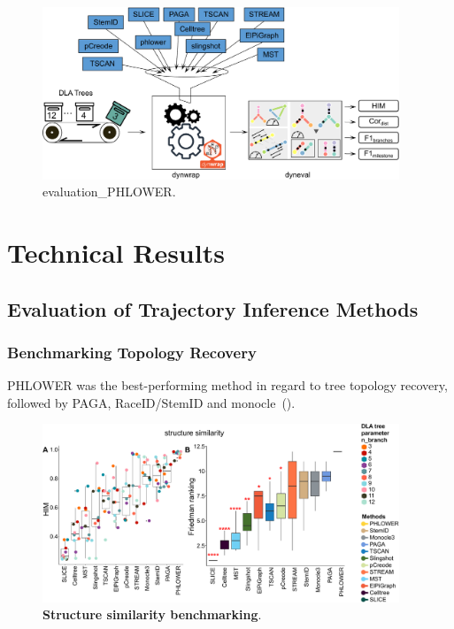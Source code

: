 \begin{figure}[!ht]
	\centering
	\includegraphics[width=0.95\textwidth]{evaluation_PHLOWER/fig}
	\vspace{0.1cm}
	\caption[evaluation\_PHLOWER]{
	evaluation\_PHLOWER.}
	\label{fig:evaluation_PHLOWER}
\end{figure}

\section{Technical Results}
\label{chapter:PHLOWER_bench:tech_out}
\subsection{Evaluation of Trajectory Inference Methods}

\subsubsection{Benchmarking Topology Recovery}
PHLOWER was the best-performing method in regard to tree topology recovery, followed by PAGA, RaceID/StemID and monocle~(). 
\begin{figure}[!h]
	\centering
	\includegraphics[width=0.95\textwidth]{HIM/fig}
	\vspace{0.1cm}
	\caption[Structure similarity benchmarking]{
	\textbf{Structure similarity benchmarking}.}
	\label{fig:HIM}
\end{figure}


